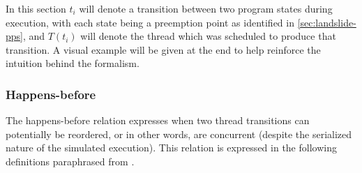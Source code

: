 In this section $t_i$ will denote a transition between two program states during execution,
with each state being a preemption point as identified in \cref{sec:landslide-pps},
and $T(t_i)$ will denote the thread which was scheduled  to produce that transition.
A visual example will be given at the end to help reinforce the intuition behind the formalism.

\subsubsection{Happens-before}
\label{sec:landslide-dpor-hb}

The happens-before relation expresses when two thread transitions can potentially be reordered,
or in other words, are  concurrent (despite the serialized nature of the simulated execution).
This relation is expressed in the following definitions paraphrased from \cite{dpor}.

